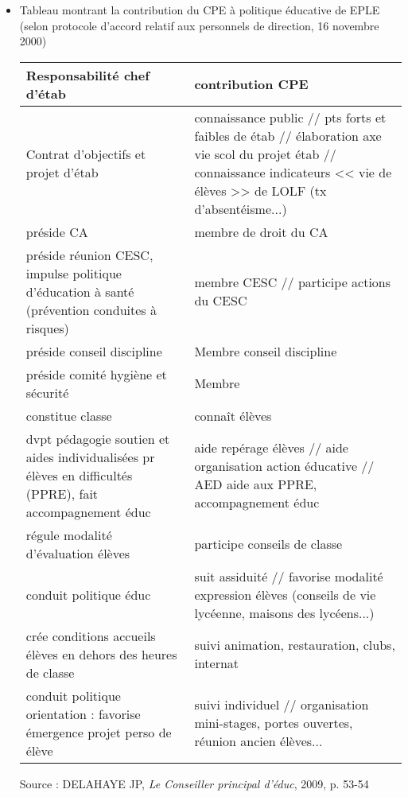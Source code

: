 \documentclass[12pt]{report}
\begin{document}
\begin{itemize}
\begin{itemize}
\item Tableau montrant la contribution du CPE à politique éducative de EPLE (selon protocole d'accord relatif aux personnels de direction, 16 novembre 2000) \\
\begin{tabular}{|p{8cm}|p{8cm}|}
\hline Responsabilité chef d'étab & contribution CPE \\ 
\hline Contrat d'objectifs et projet d'étab & connaissance public // pts forts et faibles de étab // élaboration axe vie scol du projet étab // connaissance indicateurs << vie de élèves >> de LOLF (tx d'absentéisme...) \\ 
\hline préside CA & membre de droit du CA \\ 
\hline préside réunion CESC, impulse politique d'éducation à santé (prévention conduites à risques) & membre CESC // participe actions du CESC \\ 
\hline préside conseil discipline & Membre conseil discipline \\ 
\hline préside comité hygiène et sécurité & Membre \\ 
\hline constitue classe & connaît élèves \\ 
\hline dvpt pédagogie soutien et aides individualisées pr élèves en difficultés (PPRE), fait accompagnement éduc & aide repérage élèves // aide organisation action éducative // AED aide aux PPRE, accompagnement éduc \\ 
\hline régule modalité d'évaluation élèves & participe conseils de classe \\ 
\hline conduit politique éduc & suit assiduité // favorise modalité expression élèves (conseils de vie lycéenne, maisons des lycéens...) \\ 
\hline crée conditions accueils élèves en dehors des heures de classe & suivi animation, restauration, clubs, internat \\ 
\hline conduit politique orientation : favorise émergence projet perso de élève & suivi individuel // organisation mini-stages, portes ouvertes, réunion ancien élèves... \\ 
\hline 
\end{tabular} 

\begin{flushright}
Source : DELAHAYE JP, \textit{Le Conseiller principal d'éduc}, 2009, p. 53-54
\end{flushright}

\end{itemize}


\end{itemize}
\end{document}
